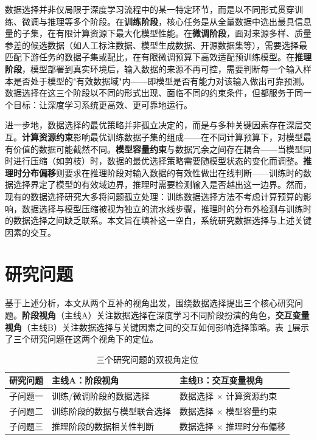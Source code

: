 数据选择并非仅局限于深度学习流程中的某一特定环节，而是以不同形式贯穿训练、微调与推理等多个阶段。在\textbf{训练阶段}，核心任务是从全量数据中选出最具信息量的子集，在有限计算资源下最大化模型性能\cite{mirzasoleiman2020coresets, paul2021deep}。在\textbf{微调阶段}，面对来源多样、质量参差的候选数据（如人工标注数据、模型生成数据、开源数据集等），需要选择最匹配下游任务的数据子集或配比，在有限微调预算下高效适配预训练模型\cite{zhou2023lima, chen2023alpagasus}。在\textbf{推理阶段}，模型部署到真实环境后，输入数据的来源不再可控，需要判断每一个输入样本是否处于模型的"有效数据域"内——即模型是否有能力对该输入做出可靠预测\cite{hendrycks2016msp, yang2021generalized_survey}。数据选择在这三个阶段以不同的形式出现、面临不同的约束条件，但都服务于同一个目标：让深度学习系统更高效、更可靠地运行。

进一步地，数据选择的最优策略并非孤立决定的，而是与多种关键因素存在深层交互。\textbf{计算资源约束}影响最优训练数据子集的组成——在不同计算预算下，对模型最有价值的数据可能截然不同\cite{yin2024compute}。\textbf{模型容量约束}与数据冗余之间存在耦合——当模型同时进行压缩（如剪枝\cite{han2015learning}）时，数据的最优选择策略需要随模型状态的变化而调整。\textbf{推理时分布偏移}则要求在推理阶段对输入数据的有效性做出在线判断——训练时的数据选择界定了模型的有效域边界，推理时需要检测输入是否越出这一边界\cite{yang2021generalized_survey}。然而，现有的数据选择研究大多将问题孤立处理：训练数据选择方法不考虑计算预算的影响\cite{killamsetty2021grad, paul2021deep}，数据选择与模型压缩被视为独立的流水线步骤\cite{evci2020rigging}，推理时的分布外检测与训练时的数据选择之间缺乏联系\cite{sun2021react, liu2020energy}。本文旨在填补这一空白，系统研究数据选择与上述关键因素的交互。


\section{研究问题}

基于上述分析，本文从两个互补的视角出发，围绕数据选择提出三个核心研究问题。\textbf{阶段视角}（主线A）关注数据选择在深度学习不同阶段扮演的角色，\textbf{交互变量视角}（主线B）关注数据选择与关键因素之间的交互如何影响选择策略。表~\ref{tab:research-questions}展示了三个研究问题在这两个视角下的定位。

\begin{table}[htb]
  \centering
  \caption{三个研究问题的双视角定位}
  \label{tab:research-questions}
  \begin{tabular}{cll}
    \toprule
    研究问题 & 主线A：阶段视角 & 主线B：交互变量视角 \\
    \midrule
    子问题一 & 训练/微调阶段的数据选择 & 数据选择 $\times$ 计算资源约束 \\
    子问题二 & 训练阶段的数据与模型联合选择 & 数据选择 $\times$ 模型容量约束 \\
    子问题三 & 推理阶段的数据相关性判断 & 数据选择 $\times$ 推理时分布偏移 \\
    \bottomrule
  \end{tabular}
\end{table}

